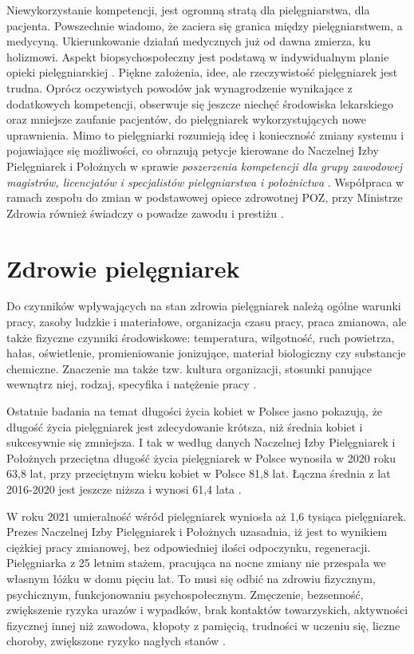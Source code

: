 \documentclass[a4paper,12pt,twoside,openright]{mwrep}
\begin{document}
Niewykorzystanie  kompetencji, jest ogromną stratą dla pielęgniarstwa, dla pacjenta. Powszechnie wiadomo, że zaciera się granica między pielęgniarstwem, a medycyną. Ukierunkowanie działań medycznych już od dawna zmierza, ku holizmowi. Aspekt biopsychospołeczny jest podstawą w indywidualnym planie opieki pielęgniarskiej \cite{dorota}. Piękne założenia, idee, ale rzeczywistość pielęgniarek jest trudna. Oprócz oczywistych powodów jak wynagrodzenie wynikające z dodatkowych kompetencji, obserwuje się jeszcze niechęć środowiska lekarskiego oraz mniejsze zaufanie pacjentów, do pielęgniarek wykorzystujących nowe uprawnienia. Mimo to pielęgniarki rozumieją ideę i konieczność zmiany systemu i  pojawiające się możliwości, co obrazują petycje kierowane do Naczelnej Izby Pielęgniarek i Położnych w sprawie \textit{poszerzenia kompetencji dla grupy zawodowej magistrów, licencjatów i specjalistów pielęgniarstwa i położnictwa} \cite{petycja}. Współpraca w ramach zespołu do zmian w podstawowej opiece zdrowotnej POZ, przy Ministrze Zdrowia również świadczy o powadze zawodu i prestiżu \cite{poz}.

\section{Zdrowie pielęgniarek}
\label{sectionZdrowiePielegniarek}
Do czynników wpływających na stan zdrowia pielęgniarek należą ogólne warunki pracy, zasoby ludzkie i materiałowe, organizacja czasu pracy,  praca zmianowa, ale także fizyczne czynniki środowiskowe: temperatura, wilgotność, ruch powietrza, hałas, oświetlenie, promieniowanie jonizujące, materiał biologiczny czy substancje chemiczne. Znaczenie ma także tzw. kultura organizacji, stosunki panujące wewnątrz niej, rodzaj, specyfika i natężenie pracy \cite{obciazenia}.

Ostatnie badania na temat długości życia kobiet w Polsce jasno pokazują, że długość życia pielęgniarek jest zdecydowanie krótsza, niż średnia kobiet i sukcesywnie się zmniejsza. I tak w według danych Naczelnej Izby Pielęgniarek i Położnych przeciętna długość życia pielęgniarek w Polsce wynosiła w 2020 roku 63,8 lat, przy przeciętnym wieku kobiet w Polsce 81,8 lat. Łączna średnia z lat 2016-2020 jest jeszcze niższa i wynosi 61,4 lata \cite{statystyka}.

W roku 2021 umieralność wśród pielęgniarek wyniosła aż 1,6 tysiąca pielęgniarek. Prezes Naczelnej Izby Pielęgniarek i Położnych uzasadnia, iż jest to wynikiem ciężkiej pracy zmianowej, bez odpowiedniej ilości odpoczynku, regeneracji. Pielęgniarka z 25 letnim stażem, pracująca na nocne zmiany nie przespała we własnym łóżku w domu pięciu lat. To musi się odbić na zdrowiu fizycznym, psychicznym, funkcjonowaniu psychospołecznym. Zmęczenie, bezsenność, zwiększenie ryzyka urazów i wypadków, brak kontaktów towarzyskich, aktywności fizycznej innej niż zawodowa, kłopoty z pamięcią, trudności w uczeniu się, liczne choroby, zwiększone ryzyko nagłych stanów \cite{zgony}.
\end{document}
